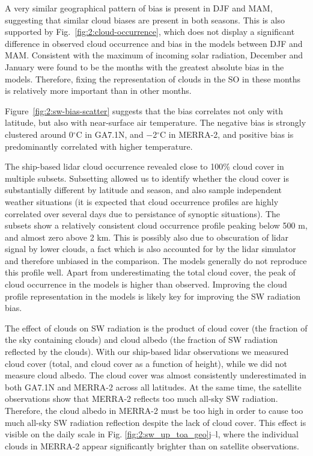 A very similar geographical pattern of bias is present in DJF and
MAM, suggesting that similar cloud biases are present in both seasons. This
is also supported by Fig.~\ref{fig:2:cloud-occurrence}, which does not display
a significant difference in observed cloud occurrence and bias in the models
between DJF and MAM.  Consistent with the maximum of incoming solar radiation,
December and January were found to be the months with the greatest absolute
bias in the models. Therefore, fixing the representation of clouds in the SO
in these months is relatively more important than in other months.

Figure~\ref{fig:2:sw-bias-scatter} suggests that the bias correlates not only
with latitude, but also with near-surface air temperature. The negative bias
is strongly clustered around 0$^\circ$C in GA7.1N, and $-$2$^\circ$C in
MERRA-2, and positive bias is predominantly correlated with higher temperature.

The ship-based lidar cloud occurrence revealed close to 100\% cloud cover in
multiple subsets. Subsetting allowed us to identify whether the cloud cover is
substantially different by latitude and season, and also sample independent
weather situations (it is expected that cloud occurrence profiles are highly
correlated over several days due to persistance of synoptic situations). The
subsets show a relatively consistent cloud occurrence profile peaking below 500
m, and almost zero above 2 km. This is possibly also due to
obscuration of lidar signal by lower clouds, a fact which is also accounted
for by the lidar simulator and therefore unbiased in the comparison.
The models generally do not
reproduce this profile well. Apart from underestimating the total cloud cover,
the peak of cloud occurrence in the models is higher than observed. Improving
the cloud profile representation in the models is likely key for improving the
SW radiation bias.

The effect of clouds on SW radiation is the product of cloud cover (the
fraction of the sky containing clouds) and cloud albedo (the fraction of SW
radiation reflected by the clouds). With our ship-based lidar observations we
measured cloud cover (total, and cloud cover as a function of height), while we
did not measure cloud albedo. The cloud cover was almost consistently
underestimated in both GA7.1N and MERRA-2 across all latitudes. At the same
time, the satellite observations show that MERRA-2 reflects too much all-sky SW
radiation. Therefore, the cloud albedo in MERRA-2 must be too high in order to
cause too much all-sky SW radiation reflection despite the lack of cloud cover.
This effect is visible on the daily scale in Fig.
\ref{fig:2:sw_up_toa_geo}j--l, where the individual clouds in MERRA-2 appear
significantly brighter than on satellite observations.

